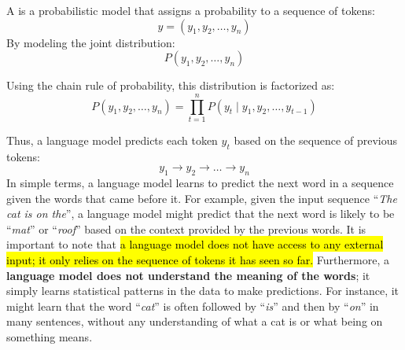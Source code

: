 \highspace
\begin{definitionbox}
    A  is a probabilistic model that assigns a probability to a sequence of tokens:
    \begin{equation*}
        y = \left(y_1, y_2, \dots, y_n\right)
    \end{equation*}
    By modeling the joint distribution:
    \begin{equation*}
        P\left(y_1, y_2, \dots, y_n\right)
    \end{equation*}

    \highspace
    Using the chain rule of probability, this distribution is factorized as:
    \begin{equation}
        P\left(y_1, y_2, \dots, y_n\right)
        =
        \prod_{t=1}^{n}
        P\left(y_t \mid y_1, y_2, \dots, y_{t-1}\right)
    \end{equation}

    \highspace
    Thus, a language model predicts each token $y_t$ based on the sequence of previous tokens:
    \begin{equation*}
        y_1 \rightarrow y_2 \rightarrow \dots \rightarrow y_n
    \end{equation*}
    In simple terms, a language model learns to predict the next word in a sequence given the words that came before it. For example, given the input sequence ``\emph{The cat is on the}'', a language model might predict that the next word is likely to be ``\emph{mat}'' or ``\emph{roof}'' based on the context provided by the previous words. It is important to note that \hl{a language model does not have access to any external input; it only relies on the sequence of tokens it has seen so far.} Furthermore, a \textbf{language model does not understand the meaning of the words}; it simply learns statistical patterns in the data to make predictions. For instance, it might learn that the word ``\emph{cat}'' is often followed by ``\emph{is}'' and then by ``\emph{on}'' in many sentences, without any understanding of what a cat is or what being on something means.
\end{definitionbox}


